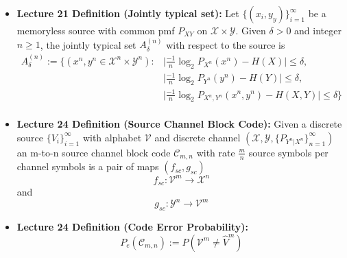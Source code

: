 \documentclass{article}
\begin{document}
\begin{itemize}
    \item \textbf{Lecture 21 Definition (Jointly typical set): }
    Let \(\{(x_i, y_y)\}_{i=1}^\infty\) be a memoryless source with common pmf \(P_{XY}\) on \(\mathcal{X} \times \mathcal{Y}\). Given \(\delta>0\) and integer \(n\geq 1\), the jointly typical set \(A^{(n)}_\delta\) with respect to the source is
    \begin{align*}
        A^{(n)}_\delta := \{ (x^n, y^n \in \mathcal{X}^n \times \mathcal{Y}^n) :& \big|\frac{-1}{n} \log_2 P_{X^n} (x^n) - H(X)\big| \leq \delta, \\
        & \big|\frac{-1}{n} \log_2 P_{Y^n}(y^n) - H(Y)\big| \leq \delta, \\
        & \big|\frac{-1}{n} \log_2 P_{X^n, Y^n} (x^n, y^n) - H(X,Y)\big| \leq \delta\} \\
    \end{align*}
    \item \textbf{Lecture 24 Definition (Source Channel Block Code):}
    Given a discrete source \(\{V_i\}_{i=1}^\infty\) with alphabet \(\mathcal{V}\) and discrete channel \((\mathcal{X}, \mathcal{Y}, \{P_{Y^n|X^n}\}_{n=1}^\infty)\) an m-to-n source channel block
    code \(\mathcal{C}_{m,n}\) with rate \(\frac{m}{n}\) source symbols per channel symbols is a pair of maps \((f_{sc}, g_{sc})\)
    \[f_{sc}: \mathcal{V}^m \to \mathcal{X}^n\]
    and 
    \[g_{sc}: \mathcal{Y}^n \to \mathcal{V}^m\]

    \item \textbf{Lecture 24 Definition (Code Error Probability):}
    \[P_e(\mathcal{C}_{m,n}):=P(\mathcal{V}^m \neq \hat{V}^m)\]

\end{itemize}
\end{document}
